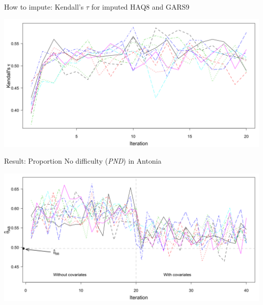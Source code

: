 \documentclass[ignorenonframetext,aspectratio=43]{beamer}
\begin{document}
\begin{frame}{How to impute: Kendall's \(\tau\) for imputed HAQ8 and
GARS9}
\protect\hypertarget{how-to-impute-kendalls-tau-for-imputed-haq8-and-gars9}{}

\includegraphics{figures/ch9-walkingimpute7b-1.png}

\end{frame}

\begin{frame}{Result: Proportion No difficulty (\emph{PND}) in Antonia}
\protect\hypertarget{result-proportion-no-difficulty-pnd-in-antonia}{}

\includegraphics{figures/ch9-walkingplotthetaAB-1.png}

\end{frame}
\end{document}
